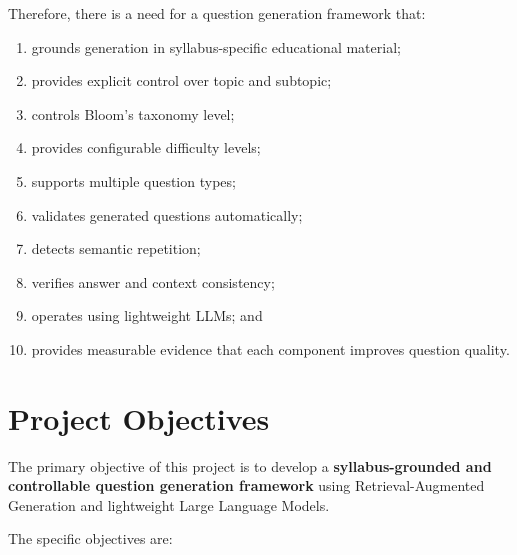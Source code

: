 \documentclass[12pt,a4paper]{report}
\begin{document}
Therefore, there is a need for a question generation framework that:

\begin{enumerate}
    \item grounds generation in syllabus-specific educational material;
    \item provides explicit control over topic and subtopic;
    \item controls Bloom's taxonomy level;
    \item provides configurable difficulty levels;
    \item supports multiple question types;
    \item validates generated questions automatically;
    \item detects semantic repetition;
    \item verifies answer and context consistency;
    \item operates using lightweight LLMs; and
    \item provides measurable evidence that each component improves question quality.
\end{enumerate}


\chapter{Project Objectives}

The primary objective of this project is to develop a \textbf{syllabus-grounded and controllable question generation framework} using Retrieval-Augmented Generation and lightweight Large Language Models.

The specific objectives are:
\end{document}
